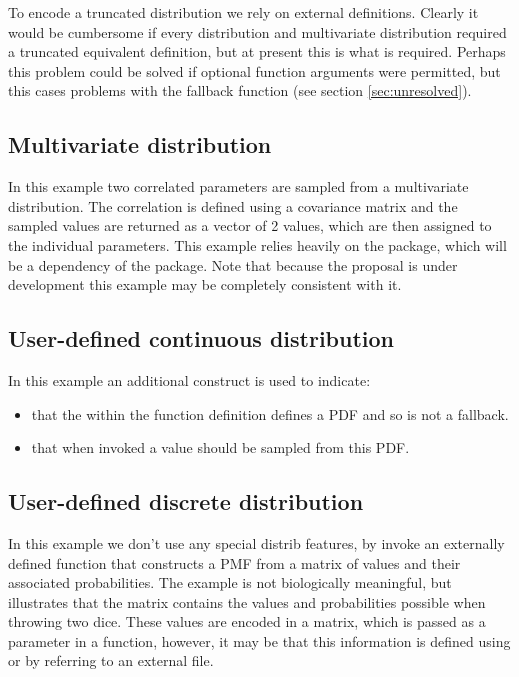 \documentclass[draftspec]{sbmlpkgspec}
\begin{document}
To encode a truncated distribution we rely on external
definitions. Clearly it would be cumbersome if every distribution and
multivariate distribution required a truncated equivalent definition,
but at present this is what is required\contraversial. Perhaps this
problem could be solved if optional function arguments were permitted,
but this cases problems with the fallback function (see section \ref{sec:unresolved}).


\subsection{Multivariate distribution}

In this example two correlated parameters are sampled from a
multivariate distribution. The correlation is defined using a
covariance matrix and the sampled values are returned as a vector of 2
values, which are then assigned to the individual parameters. This
example relies heavily on the \arraysshort package, which will be a
dependency of the \distribshort package. Note that because the
\arraysshort proposal is under development this example may be
completely consistent with it.


\subsection{User-defined continuous distribution }

In this example an additional construct is used to indicate:
\begin{itemize}
\item that the \mathml within the function definition defines a PDF and so is not a
fallback.
\item that when invoked a value should be sampled from this PDF.
\end{itemize}



\subsection{User-defined discrete distribution}
\label{sec:userDefinedDiscrete}

In this example we don't use any special distrib features, by invoke
an externally defined function that constructs a PMF from a matrix of
values and their associated probabilities. The example is not
biologically meaningful, but illustrates that the matrix contains the
values and probabilities possible when throwing two dice. These values
are encoded in a matrix, which is passed as a parameter in a function,
however, it may be that this information is defined using
\numl\contraversial or by referring to an external file.
\end{document}
